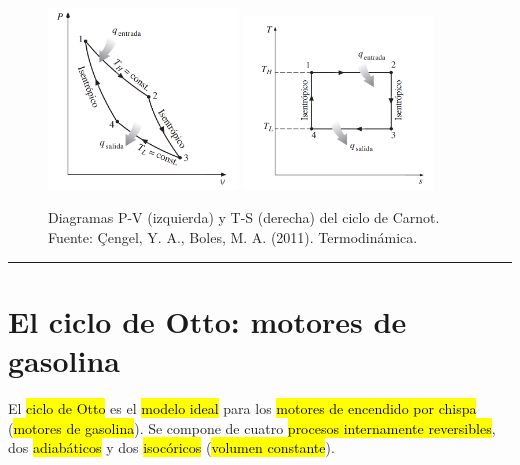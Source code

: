 \documentclass{article}
\begin{document}
\begin{figure}[h!]
    \centering
    \includegraphics[width=0.45\textwidth]{diagrama-PV-carnot.png}
    \hfill
    \includegraphics[width=0.45\textwidth]{diagrama-TS-carnot.png}
    \caption{Diagramas P-V (izquierda) y T-S (derecha) del ciclo de Carnot. {\small Fuente: Çengel, Y. A., Boles, M. A. (2011). Termodinámica.}}
    \label{fig:carnot_diagrams}
\end{figure}

\hrule

\section{El ciclo de Otto: motores de gasolina}

El \hl{ciclo de Otto} es el \hl{modelo ideal} para los \hl{motores de encendido por chispa} (\hl{motores de gasolina}). Se compone de cuatro \hl{procesos internamente reversibles}, dos \hl{adiabáticos} y dos \hl{isocóricos} (\hl{volumen constante}).
\end{document}
